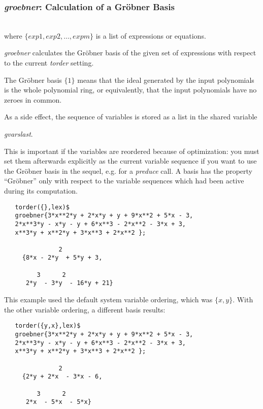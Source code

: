 \subsubsection{\emph{groebner}: Calculation of a Gr\"obner Basis}
\begin{description}
\item[{\it groebner} $\{exp1, exp2, \ldots , expm\};$]\mbox{}\\
  \hypertarget{operator:GROEBNER}{}
where $\{exp1, exp2, \ldots , expm\}$ is a list of
expressions or equations.

\emph{groebner} calculates the Gr\"obner basis of the given set of
expressions with respect to the current \emph{torder} setting.

The Gr\"obner basis $\{1\}$ means that the ideal generated by the
input polynomials is the whole polynomial ring, or equivalently, that
the input polynomials have no zeroes in common.

As a side effect, the sequence of variables is stored as a \REDUCE list
in the shared variable
\hypertarget{reserved:GVARSLAST}{}
\begin{center}
\emph{gvarslast}.
\end{center}

This is important if the variables are reordered because of optimization:
you must set them afterwards explicitly as the current variable sequence
if you want to use the Gr\"obner basis in the sequel, e.g. for a
\emph{preduce} call. A basis has the property ``Gr\"obner'' only with respect
to the variable sequences which had been active during its computation.
\end{description}

\example {}
\begin{verbatim}
   torder({},lex)$
   groebner{3*x**2*y + 2*x*y + y + 9*x**2 + 5*x - 3,
   2*x**3*y - x*y - y + 6*x**3 - 2*x**2 - 3*x + 3,
   x**3*y + x**2*y + 3*x**3 + 2*x**2 };

               2
     {8*x - 2*y  + 5*y + 3,

         3      2
      2*y  - 3*y  - 16*y + 21}
\end{verbatim}


This example used the default system variable ordering, which was
$\{x,y\}$. With the other variable ordering, a different basis results:

\begin{verbatim}
   torder({y,x},lex)$
   groebner{3*x**2*y + 2*x*y + y + 9*x**2 + 5*x - 3,
   2*x**3*y - x*y - y + 6*x**3 - 2*x**2 - 3*x + 3,
   x**3*y + x**2*y + 3*x**3 + 2*x**2 };

               2
     {2*y + 2*x  - 3*x - 6,

         3      2
      2*x  - 5*x  - 5*x}
\end{verbatim}


